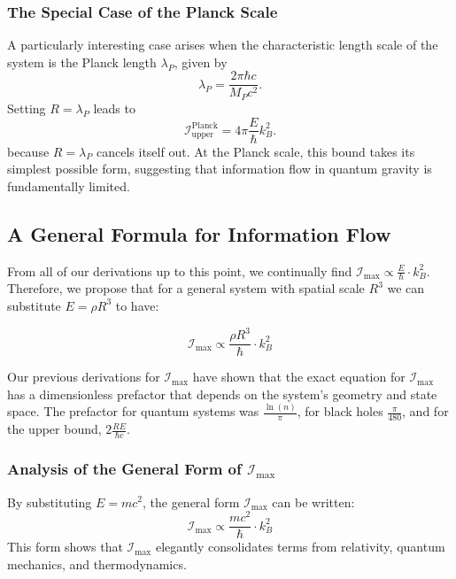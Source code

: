 \documentclass[12pt]{article}
\begin{document}
\subsubsection{The Special Case of the Planck Scale}

A particularly interesting case arises when the characteristic length scale of the system is the Planck length \( \lambda_P \), given by
\begin{equation}
    \lambda_P = \frac{2\pi \hbar c}{M_P c^2}.
\end{equation}
Setting \( R = \lambda_P \) leads to
\begin{equation}
    \mathcal{I}_{\text{upper}}^{\text{Planck}} = 4\pi \frac{E}{\hbar} k_B^2.
\end{equation}
because \( R = \lambda_P \) cancels itself out. At the Planck scale, this bound takes its simplest possible form, suggesting that information flow in quantum gravity is fundamentally limited.


\subsection{A General Formula for Information Flow}

From all of our derivations up to this point, we continually find \(\mathcal{I}_{\max} \propto \frac{E}{\hbar} \cdot k_B^2\). Therefore, we propose that for a general system with spatial scale $R^3$ we can substitute $E = \rho R^3$ to have:

\begin{equation}
    \mathcal{I}_{\max} \propto \frac{\rho R^3}{\hbar} \cdot k_B^2
\end{equation}

Our previous derivations for $\mathcal{I}_{\max}$ have shown that the exact equation for $\mathcal{I}_{\max}$ has a dimensionless prefactor that depends on the system's geometry and state space. The prefactor for quantum systems was $\frac{\ln(n)}{\pi}$, for black holes $\frac{\pi}{480}$, and for the upper bound, $2 \frac{RE}{\hbar c}$.

\subsubsection{Analysis of the General Form of $\mathcal{I}_{\max}$}

By substituting $E = mc^2$, the general form \(\mathcal{I}_{\max}\) can be written:
\begin{equation}
    \mathcal{I}_{\max} \propto \frac{mc^2}{\hbar} \cdot k_B^2
\end{equation}
This form shows that \(\mathcal{I}_{\max}\) elegantly consolidates terms from relativity, quantum mechanics, and thermodynamics.
\end{document}
